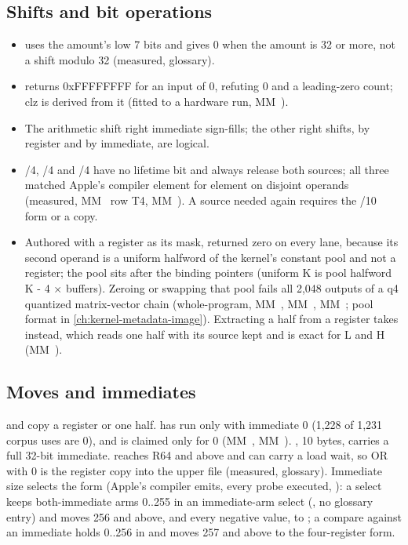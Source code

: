 \subsection*{Shifts and bit operations}

\begin{itemize}
\item {} uses the amount's low 7 bits and gives 0 when the amount is 32 or more, not
  a shift modulo 32 (measured, glossary).
\item {} returns 0xFFFFFFFF for an input of 0, refuting 0 and a leading-zero
  count; clz is derived from it (fitted to a hardware run, MM~).
\item The arithmetic shift right immediate sign-fills; the other right shifts, by register and by immediate, are logical.
\item {}/4, /4 and /4 have no lifetime bit and always release both sources; all three matched Apple's compiler element for
  element on disjoint operands (measured, MM~ row T4, MM~). A source needed again requires the /10 form or a
  copy.
\item Authored with a register as its mask,  returned zero on
  every lane, because its second operand is a uniform halfword of the kernel's constant pool and not a
  register; the pool sits after the binding pointers (uniform K is pool halfword K - 4 × buffers). Zeroing or
  swapping that pool fails all 2,048 outputs of a q4 quantized matrix-vector chain (whole-program, MM~,
  MM~, MM~; pool format in \cref{ch:kernel-metadata-image}). Extracting a half from a register takes  instead, which reads one half with its source kept and is exact for L and H (MM~).
\end{itemize}

\subsection*{Moves and immediates}

 and  copy a register or one half.
 has run only with immediate 0 (1,228 of 1,231 corpus uses are 0), and  is claimed only for 0 (MM~, MM~). , 10 bytes, carries a full 32-bit immediate.  reaches
R64 and above and can carry a load wait, so OR with 0 is the register copy into the upper file (measured,
glossary). Immediate size selects the form (Apple's compiler emits, every probe executed, ):
a select keeps both-immediate arms 0..255 in an immediate-arm select (, no glossary entry) and moves 256 and above,
and every negative value, to ; a compare against an immediate holds 0..256
in  and moves 257 and above to the four-register form.

